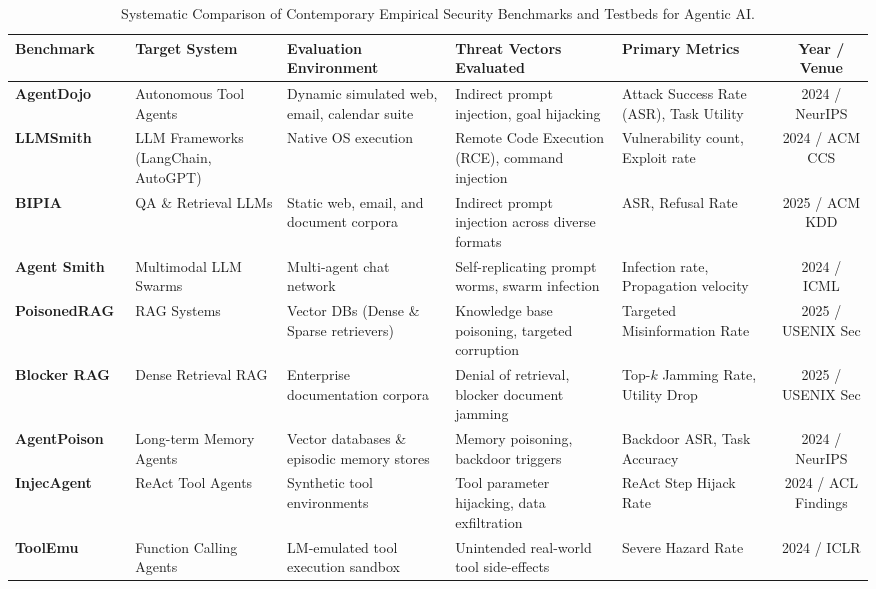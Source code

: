 \begin{table}[t]
\centering
\caption{Systematic Comparison of Contemporary Empirical Security Benchmarks and Testbeds for Agentic AI.}
\label{tab:benchmark_comparison}
\footnotesize
\begin{tabularx}{\columnwidth}{l p{2.1cm} p{2.4cm} X X c}
\toprule
\textbf{Benchmark} & \textbf{Target System} & \textbf{Evaluation Environment} & \textbf{Threat Vectors Evaluated} & \textbf{Primary Metrics} & \textbf{Year / Venue} \\
\midrule
\textbf{AgentDojo}~\cite{debenedetti2024agentdojo} & Autonomous Tool Agents & Dynamic simulated web, email, calendar suite & Indirect prompt injection, goal hijacking & Attack Success Rate (ASR), Task Utility & 2024 / NeurIPS \\
\textbf{LLMSmith}~\cite{liu2024demystifying} & LLM Frameworks (LangChain, AutoGPT) & Native OS execution & Remote Code Execution (RCE), command injection & Vulnerability count, Exploit rate & 2024 / ACM CCS \\
\textbf{BIPIA}~\cite{yi2025benchmarking} & QA \& Retrieval LLMs & Static web, email, and document corpora & Indirect prompt injection across diverse formats & ASR, Refusal Rate & 2025 / ACM KDD \\
\textbf{Agent Smith}~\cite{gu2024agent} & Multimodal LLM Swarms & Multi-agent chat network & Self-replicating prompt worms, swarm infection & Infection rate, Propagation velocity & 2024 / ICML \\
\textbf{PoisonedRAG}~\cite{zou2025poisonedrag} & RAG Systems & Vector DBs (Dense \& Sparse retrievers) & Knowledge base poisoning, targeted corruption & Targeted Misinformation Rate & 2025 / USENIX Sec \\
\textbf{Blocker RAG}~\cite{shafran2025machine} & Dense Retrieval RAG & Enterprise documentation corpora & Denial of retrieval, blocker document jamming & Top-$k$ Jamming Rate, Utility Drop & 2025 / USENIX Sec \\
\textbf{AgentPoison}~\cite{chen2024agentpoison} & Long-term Memory Agents & Vector databases \& episodic memory stores & Memory poisoning, backdoor triggers & Backdoor ASR, Task Accuracy & 2024 / NeurIPS \\
\textbf{InjecAgent}~\cite{zhan2024injecagent} & ReAct Tool Agents & Synthetic tool environments & Tool parameter hijacking, data exfiltration & ReAct Step Hijack Rate & 2024 / ACL Findings \\
\textbf{ToolEmu}~\cite{ruan2023identifying} & Function Calling Agents & LM-emulated tool execution sandbox & Unintended real-world tool side-effects & Severe Hazard Rate & 2024 / ICLR \\
\bottomrule
\end{tabularx}
\end{table}
